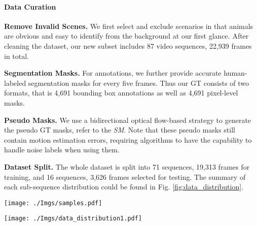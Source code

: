 \documentclass[10pt,twocolumn,letterpaper]{article}
\def\ie{\emph{i.e.}}
\begin{document}
\paragraph{Data Curation}
\begin{compactitem}
\item \textbf{Remove Invalid Scenes.} We first select and exclude scenarios in that animals are obvious and easy to identify from the background at our first glance. After cleaning the dataset, our new subset includes 87 video sequences, 22,939 frames in total.
\item \textbf{Segmentation Masks.} For annotations, we further provide accurate human-labeled segmentation masks for every five frames. Thus our  GT consists of two formats, that is 4,691 bounding box annotations as well as 4,691 pixel-level masks.
\item \textbf{Pseudo Masks.} We use a bidirectional optical flow-based strategy to generate the pseudo GT masks, refer to the \textit{SM}. Note that these pseudo masks still contain motion estimation errors, requiring algorithms to have the capability to handle noise labels when using them. \item \textbf{Dataset Split.} The whole dataset is split into 71 sequences, 19,313 frames for training, and 16 sequences, 3,626 frames selected for testing. The summary of each sub-sequence distribution could be found in Fig. \ref{fig:data_distribution}. 
\end{compactitem}


\begin{figure*}[!ht]
\begin{center}
\vspace{-5mm}
\texttt{[image: ./Imgs/samples.pdf]}
\end{center}
\vspace{-8mm}
\caption{Representative samples from MoCA-Mask. The dataset is quite challenging including diverse scenes, suash as various lighting conditions, \ie~ dark and sunny, complex background, camera motions, small ratio of animals and tiny body structures, such as slim torso /limbs.}
\label{fig:samples}
\end{figure*}


\begin{figure*}[ht]
\begin{center}
\texttt{[image: ./Imgs/data\_distribution1.pdf]}
\end{center}
\vspace{-8mm}
\caption{Summary for training and test set distribution. Our MoCA-Mask dataset includes 87 video sequences in total, in which 16 sequences were tagged as ``unknow'' (colored in orange). This split is used to validate the sensitivity of different models on novel samples. Zoom-in for details.}
\label{fig:data_distribution}
\end{figure*}
\end{document}
